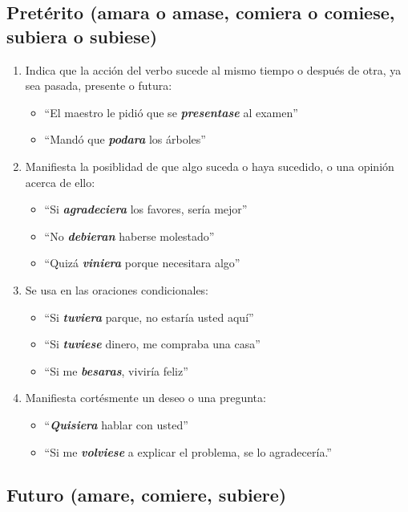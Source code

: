 \documentclass[14pt]{extarticle}
\newcommand{\marcatexto}[1]{\textbf{\textit{#1}}}
\begin{document}
\subsection{Pretérito (amara o amase, comiera o comiese, subiera o subiese)}

\begin{enumerate}[label=\alph*)]
\item Indica que la acción del verbo sucede al mismo tiempo o después de otra, ya sea pasada, presente o futura:
\begin{itemize}
\item \enquote{El maestro le pidió que se \marcatexto{presentase} al examen}
\item \enquote{Mandó que \marcatexto{podara} los árboles}
\end{itemize}
\item Manifiesta la posiblidad de que algo suceda o haya sucedido, o una opinión acerca de ello:
\begin{itemize}
\item \enquote{Si \marcatexto{agradeciera} los favores, sería mejor}
\item \enquote{No \marcatexto{debieran} haberse molestado}
\item \enquote{Quizá \marcatexto{viniera} porque necesitara algo}
\end{itemize}
\item Se usa en las oraciones condicionales:
\begin{itemize}
\item \enquote{Si \marcatexto{tuviera} parque, no estaría usted aquí}
\item \enquote{Si \marcatexto{tuviese} dinero, me compraba una casa}
\item \enquote{Si me \marcatexto{besaras}, viviría feliz}
\end{itemize}
\item Manifiesta cortésmente un deseo o una pregunta:
\begin{itemize}
\item \enquote{\marcatexto{Quisiera} hablar con usted}
\item \enquote{Si me \marcatexto{volviese} a explicar el problema, se lo agradecería.}
\end{itemize}
\end{enumerate}

\subsection{Futuro (amare, comiere, subiere)}
\end{document}
